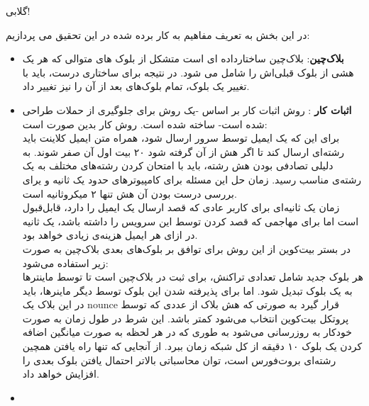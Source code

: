 گلابی!
\par
در این بخش به تعریف مفاهیم به کار برده شده در این تحقیق می پردازیم: 
\begin{itemize}
	\item 
	\textbf{بلاک‌چین}:
	بلاک‌چین ساختارداده ای است متشکل از بلوک های متوالی که هر یک هشی از بلوک قبلی‌اش را شامل می شود. در نتیجه برای ساختاری درست، باید با تغییر یک بلوک، تمام بلوک‌‌های بعد از آن را نیز تغییر داد. 
	\item
	\textbf{اثبات کار} :
	روش اثبات کار بر اساس
	\cite{hashcash}
	 -‌یک روش برای جلوگیری از حملات
	   طراحی شده است- ساخته شده است. روش کار 
	   بدین صورت است:
	   \\
	   برای این که یک ایمیل توسط سرور ارسال شود، همراه متن ایمیل کلاینت باید رشته‌ای ارسال کند تا اگر  هش 
	   از آن گرفته شود ۲۰ بیت اول آن صفر شوند. به دلیلی تصادفی بودن هش رشته، باید با امتحان کردن رشته‌‌های مختلف به یک رشته‌ی مناسب رسید. زمان حل این مسئله‌ برای کامپیوتر‌های 
	   حدود یک ثانیه و یرای بررسی درست بودن آن هش تنها ۲ میکروثانیه است.
	   \\
	   زمان یک‌ ثانیه‌ای برای کاربر عادی که قصد ارسال یک ایمیل را دارد، قابل‌قبول است اما برای مهاجمی که قصد 
	   کردن توسط این سرویس را داشته باشد، یک ثانیه در ازای هر ایمیل هزینه‌ی زیادی خواهد بود.
	   \\
	   در بستر بیت‌کوین از این روش برای توافق بر بلوک‌های بعدی بلاک‌چین به صورت زیر استفاده می‌شود:
	   \\
	هر بلوک جدید شامل تعدادی تراکنش، برای ثبت در بلاک‌چین است تا توسط ماینترها به یک بلوک تبدیل شود. اما برای پذیرفته شدن این بلوک توسط دیگر ماینرها، باید در این بلاک یک nounce قرار گیرد به صورتی که هش بلاک از عددی که توسط پروتکل بیت‌کوین انتخاب می‌شود کمتر باشد. این شرط در طول زمان به صورت خودکار به روزرسانی می‌شود به طوری که در هر لحظه به صورت میانگین اضافه کردن یک بلوک ۱۰ دقیقه از کل شبکه زمان ببرد. از آنجایی که تنها راه یافتن همچین رشته‌ای بروت‌فورس
	 است، توان محاسباتی بالاتر احتمال یافتن بلوک بعدی را افزایش خواهد داد. 
	 \\
	
	
	\item 
	

\end{itemize}
